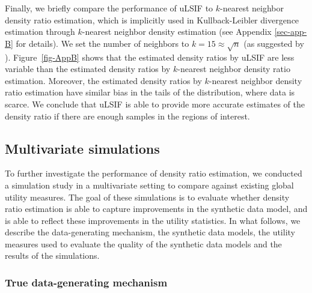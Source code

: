 \documentclass[
]{article}
\begin{document}
Finally, we briefly compare the performance of uLSIF to \(k\)-nearest
neighbor density ratio estimation, which is implicitly used in
Kullback-Leibler divergence estimation through \(k\)-nearest neighbor
density estimation (see Appendix \ref{sec-app-B} for details). We set
the number of neighbors to \(k = 15 \approx \sqrt n\) (as suggested by
). Figure~\ref{fig-AppB} shows that the estimated
density ratios by uLSIF are less variable than the estimated density
ratios by \(k\)-nearest neighbor density ratio estimation. Moreover, the
estimated density ratios by \(k\)-nearest neighbor density ratio
estimation have similar bias in the tails of the distribution, where
data is scarce. We conclude that uLSIF is able to provide more accurate
estimates of the density ratio if there are enough samples in the
regions of interest.

\subsection{Multivariate simulations}\label{multivariate-simulations}

To further investigate the performance of density ratio estimation, we
conducted a simulation study in a multivariate setting to compare
against existing global utility measures. The goal of these simulations
is to evaluate whether density ratio estimation is able to capture
improvements in the synthetic data model, and is able to reflect these
improvements in the utility statistics. In what follows, we describe the
data-generating mechanism, the synthetic data models, the utility
measures used to evaluate the quality of the synthetic data models and
the results of the simulations.

\subsubsection{True data-generating
mechanism}\label{true-data-generating-mechanism}
\end{document}
